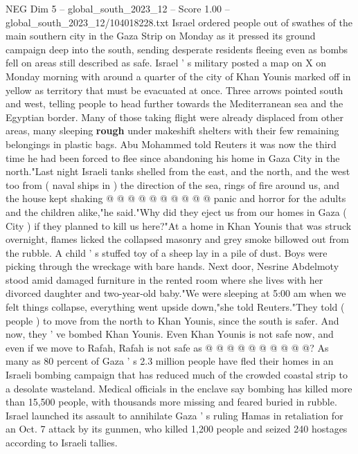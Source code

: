 \begin{textsample}{NEG Dim 5 – global\_south\_2023\_12 – Score 1.00 – global\_south\_2023\_12/104018228.txt}  \label{ex:f5_neg_353}
Israel ordered people out of swathes of the main southern city in the Gaza Strip on Monday as it pressed its ground campaign deep into the south, sending desperate residents fleeing even as bombs fell on areas still described as safe.
Israel ' s military posted a map on X on Monday morning with around a quarter of the city of Khan Younis marked off in yellow as territory that must be evacuated at once.
Three arrows pointed south and west, telling people to head further towards the Mediterranean sea and the Egyptian border.
Many of those taking flight were already displaced from other areas, many sleeping \textbf{rough} under makeshift shelters with their few remaining belongings in plastic bags.
Abu Mohammed told Reuters it was now the third time he had been forced to flee since abandoning his home in Gaza City in the north."Last night Israeli tanks shelled from the east, and the north, and the west too from ( naval ships in ) the direction of the sea, rings of fire around us, and the house kept shaking @ @ @ @ @ @ @ @ @ @ panic and horror for the adults and the children alike,"he said."Why did they eject us from our homes in Gaza ( City ) if they planned to kill us here?"At a home in Khan Younis that was struck overnight, flames licked the collapsed masonry and grey smoke billowed out from the rubble.
A child ' s stuffed toy of a sheep lay in a pile of dust.
Boys were picking through the wreckage with bare hands.
Next door, Nesrine Abdelmoty stood amid damaged furniture in the rented room where she lives with her divorced daughter and two-year-old baby."We were sleeping at 5:00 am when we felt things collapse, everything went upside down,"she told Reuters."They told ( people ) to move from the north to Khan Younis, since the south is safer.
And now, they ' ve bombed Khan Younis.
Even Khan Younis is not safe now, and even if we move to Rafah, Rafah is not safe as @ @ @ @ @ @ @ @ @ @?
As many as 80 percent of Gaza ' s 2.3 million people have fled their homes in an Israeli bombing campaign that has reduced much of the crowded coastal strip to a desolate wasteland.
Medical officials in the enclave say bombing has killed more than 15,500 people, with thousands more missing and feared buried in rubble.
Israel launched its assault to annihilate Gaza ' s ruling Hamas in retaliation for an Oct. 7 attack by its gunmen, who killed 1,200 people and seized 240 hostages according to Israeli tallies.

\end{textsample}
